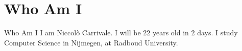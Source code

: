 \section{Who Am I}
 \frame{\sectionpage}


\begin{frame}{Who Am I}
I am Niccolò Carrivale.\newline
I will be 22 years old in 2 days.\newline
I study Computer Science in Nijmegen, at Radboud University.\newline


\end{frame}   